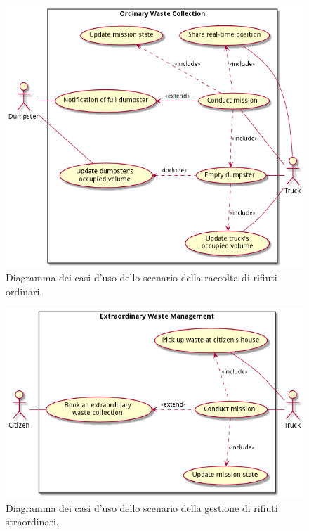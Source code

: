 \begin{figure}[H]
    \centering
    \includegraphics[width=\textwidth]{uml/ordinary-collection-use-cases.pm}
    \caption{Diagramma dei casi d'uso dello scenario della raccolta di rifiuti ordinari.}
    \label{fig:uml/ordinary-collection-use-cases}
\end{figure}


\begin{figure}[H]
    \centering
    \includegraphics[width=\textwidth]{uml/extraordinary-management-use-cases.pm}
    \caption{Diagramma dei casi d'uso dello scenario della gestione di rifiuti straordinari.}
    \label{fig:uml/extraordinary-management-use-cases}
\end{figure}



